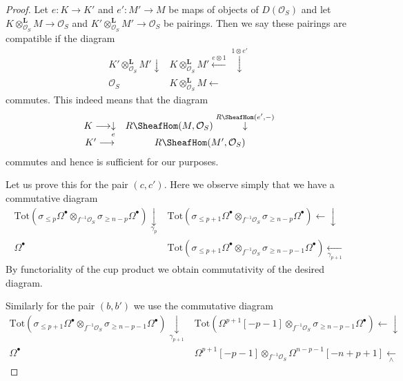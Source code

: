 \begin{proof}
\medskip\noindent
Let $e : K \to K'$ and $e' : M' \to M$ be maps of objects
of $D(\mathcal{O}_S)$ and let
$K \otimes_{\mathcal{O}_S}^\mathbf{L} M \to \mathcal{O}_S$ and
$K' \otimes_{\mathcal{O}_S}^\mathbf{L} M' \to \mathcal{O}_S$
be pairings. Then we say these pairings are compatible if the
diagram
$$
\begin{array}{cc}K' \otimes_{\mathcal{O}_S}^\mathbf{L} M' \downarrow & K \otimes_{\mathcal{O}_S}^\mathbf{L} M'
\overset{e \otimes 1}{\longleftarrow}\overset{1 \otimes e'}{\downarrow} \\ \mathcal{O}_S & K \otimes_{\mathcal{O}_S}^\mathbf{L} M \longleftarrow\end{array}
$$
commutes. This indeed means that the diagram
$$
\begin{array}{cc}K \longrightarrow\underset{e}{\downarrow} & R\SheafHom(M, \mathcal{O}_S) \overset{R\SheafHom(e', -)}{\downarrow} \\ K' \longrightarrow & R\SheafHom(M', \mathcal{O}_S)\end{array}
$$
commutes and hence is sufficient for our purposes.

\medskip\noindent
Let us prove this for the pair $(c, c')$. Here we observe simply
that we have a commutative diagram
$$
\begin{array}{cc}\text{Tot}(\sigma_{\leq p} \Omega^\bullet \otimes_{f^{-1}\mathcal{O}_S}
\sigma_{\geq n - p} \Omega^\bullet) \underset{\gamma_p}{\downarrow} & \text{Tot}(\sigma_{\leq p + 1} \Omega^\bullet \otimes_{f^{-1}\mathcal{O}_S}
\sigma_{\geq n - p} \Omega^\bullet) \longleftarrow\downarrow \\ \Omega^\bullet & \text{Tot}(\sigma_{\leq p + 1} \Omega^\bullet \otimes_{f^{-1}\mathcal{O}_S}
\sigma_{\geq n - p - 1} \Omega^\bullet) \underset{\gamma_{p + 1}}{\longleftarrow}\end{array}
$$
By functoriality of the cup product we obtain commutativity of the
desired diagram.

\medskip\noindent
Similarly for the pair $(b, b')$ we use the commutative diagram
$$
\begin{array}{cc}\text{Tot}(\sigma_{\leq p + 1} \Omega^\bullet \otimes_{f^{-1}\mathcal{O}_S}
\sigma_{\geq n - p - 1} \Omega^\bullet) \underset{\gamma_{p + 1}}{\downarrow} & \text{Tot}(\Omega^{p + 1}[-p - 1] \otimes_{f^{-1}\mathcal{O}_S}
\sigma_{\geq n - p - 1} \Omega^\bullet) \longleftarrow\downarrow \\ \Omega^\bullet & \Omega^{p + 1}[-p - 1]
\otimes_{f^{-1}\mathcal{O}_S}
\Omega^{n - p - 1}[-n + p + 1] \underset{\wedge}{\longleftarrow}\end{array}
$$


\end{proof}
